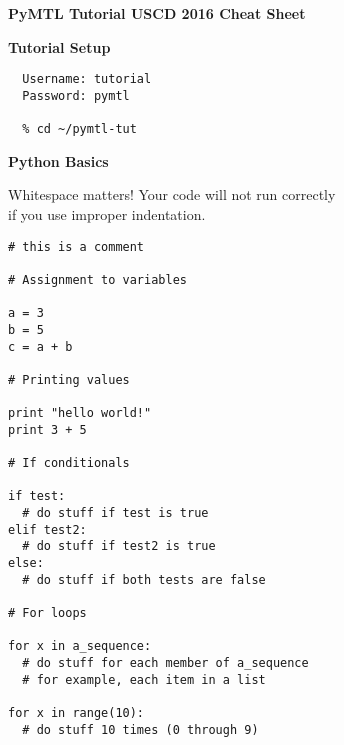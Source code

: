 \documentclass{cbxdoc}
\begin{document}
\pagestyle{empty}

\begin{landscape}
\small

\begin{center}
  \textbf{\Large PyMTL
    Tutorial  \hspace{0.5em}\textbullet\hspace{0.5em}
    USCD 2016 \hspace{0.5em}\textbullet\hspace{0.5em}
    Cheat Sheet}
\end{center}

\begin{minipage}[t]{3.25in}
\vspace{0pt}

\colorbox{gray!30!white}{\parbox{1.025\tw}{\rule[-0.4em]{0pt}{1.4em}\centering\textbf{%
  Tutorial Setup%
}}}

\smallskip\smallskip
\begin{verbatim}
  Username: tutorial
  Password: pymtl

  % cd ~/pymtl-tut
\end{verbatim}

\vspace{0.15in}
\colorbox{gray!30!white}{\parbox{1.025\tw}{\rule[-0.4em]{0pt}{1.4em}\centering\textbf{%
  Python Basics%
}}}

\begin{center}
Whitespace matters! Your code will not run correctly \\ if you use
improper indentation.
\end{center}

\vspace{-0.1in}
\begin{lstlisting}
# this is a comment

# Assignment to variables

a = 3
b = 5
c = a + b

# Printing values

print "hello world!"
print 3 + 5

# If conditionals

if test:
  # do stuff if test is true
elif test2:
  # do stuff if test2 is true
else:
  # do stuff if both tests are false

# For loops

for x in a_sequence:
  # do stuff for each member of a_sequence
  # for example, each item in a list

for x in range(10):
  # do stuff 10 times (0 through 9)


\end{lstlisting}
\end{minipage}
\end{landscape}
\end{document}
